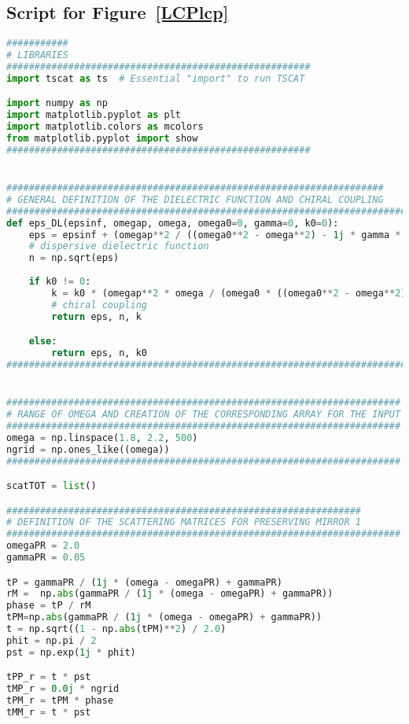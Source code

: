 \documentclass[aps,prl,10pt,onecolumn,superscriptaddress]{revtex4-2}
\begin{document}
\subsection{Script for Figure~\ref{LCPlcp}}
\begin{lstlisting}[language=Python, caption=Script for Figure \ref{LCPlcp}]
###########
# LIBRARIES
######################################################
import tscat as ts  # Essential "import" to run TSCAT

import numpy as np
import matplotlib.pyplot as plt
import matplotlib.colors as mcolors
from matplotlib.pyplot import show
######################################################


###################################################################
# GENERAL DEFINITION OF THE DIELECTRIC FUNCTION AND CHIRAL COUPLING
################################################################################################
def eps_DL(epsinf, omegap, omega, omega0=0, gamma=0, k0=0):
    eps = epsinf + (omegap**2 / ((omega0**2 - omega**2) - 1j * gamma * omega))  
    # dispersive dielectric function
    n = np.sqrt(eps)
    
    if k0 != 0:
        k = k0 * (omegap**2 * omega / (omega0 * ((omega0**2 - omega**2) - 1j * gamma * omega)))  
        # chiral coupling
        return eps, n, k

    else:
        return eps, n, k0
#################################################################################################


######################################################################
# RANGE OF OMEGA AND CREATION OF THE CORRESPONDING ARRAY FOR THE INPUT
######################################################################
omega = np.linspace(1.8, 2.2, 500)
ngrid = np.ones_like((omega))
######################################################################

scatTOT = list()

###############################################################
# DEFINITION OF THE SCATTERING MATRICES FOR PRESERVING MIRROR 1
######################################################################
omegaPR = 2.0
gammaPR = 0.05

tP = gammaPR / (1j * (omega - omegaPR) + gammaPR)
rM =  np.abs(gammaPR / (1j * (omega - omegaPR) + gammaPR))
phase = tP / rM
tPM=np.abs(gammaPR / (1j * (omega - omegaPR) + gammaPR))
t = np.sqrt((1 - np.abs(tPM)**2) / 2.0)
phit = np.pi / 2
pst = np.exp(1j * phit)

tPP_r = t * pst 
tMP_r = 0.0j * ngrid
tPM_r = tPM * phase 
tMM_r = t * pst


\end{lstlisting}
\end{document}
